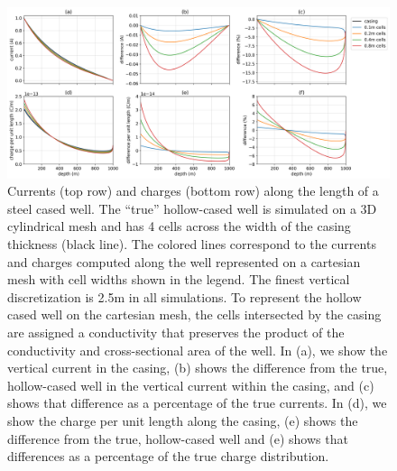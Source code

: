 \begin{figure}
    \begin{center}
    \includegraphics[width=\textwidth]{figures/dc_casing/approximating_wells_cartesian.png}
    \end{center}
\caption{
    Currents (top row) and charges (bottom row) along the length of
    a steel cased well. The ``true'' hollow-cased well is simulated on a
    3D cylindrical mesh and has 4 cells across the width of the casing thickness (black line).
    The colored lines correspond to the currents and charges computed along the
    well represented on a cartesian mesh with cell widths shown in the legend.
    The finest vertical discretization is 2.5m in all simulations. To represent the
    hollow cased well on the cartesian mesh, the cells intersected by the casing are assigned
    a conductivity that preserves the product of the conductivity and cross-sectional area of the well.
    In (a), we show the vertical current in the casing,
    (b) shows the difference from the true, hollow-cased well
    in the vertical current within the casing, and (c) shows that difference as a percentage
    of the true currents. In (d), we show the charge per unit length along the casing, (e)
    shows the difference from the true, hollow-cased well and (e) shows that differences as
    a percentage of the true charge distribution.
}
\label{fig:approximating_wells_cartesian}
\end{figure}
